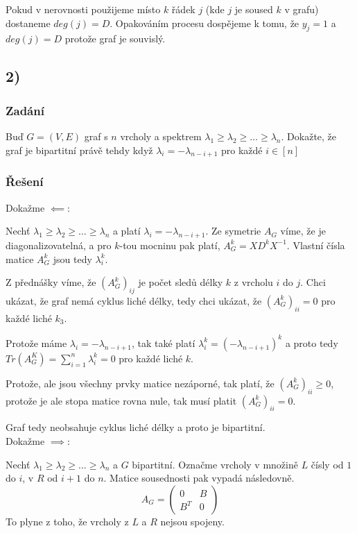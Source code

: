 \documentclass[../main.tex]{subfiles}
\begin{document}
Pokud v nerovnosti použijeme místo $k$ řádek $j$ (kde $j$ je soused $k$ v grafu) dostaneme $deg(j) = D$. Opakováním procesu dospějeme k tomu, že $y_j = 1$ a $deg(j) = D$ protože graf je souvislý.



\subsection{2)}
\subsubsection*{Zadání}
Buď $G=(V,E)$ graf s $n$ vrcholy a spektrem $\lambda_1 \geq \lambda_2 \geq \dots \geq \lambda_n$.
Dokažte, že graf je bipartitní právě tehdy když $\lambda_i = - \lambda_{n-i+1}$ pro každé $i\in [n]$

\subsubsection*{Řešení}


Dokažme $\impliedby$: 

Nechť $\lambda_1 \geq \lambda_2 \geq \dots \geq \lambda_n$ a platí $\lambda_i = - \lambda_{n-i+1}$. Ze symetrie $A_G$ víme, že je diagonalizovatelná, a pro $k$-tou mocninu pak platí, 
$A_G^k = X D^k X^{-1}$. Vlastní čísla matice $A_G^k$ jsou tedy $\lambda_i^k$.

Z přednášky víme, že $(A^k_G)_{ij}$ je počet sledů délky $k$ z vrcholu $i$ do $j$. Chci ukázat, že graf nemá cyklus liché délky, tedy chci ukázat, že $(A^k_G)_{ii} = 0$ pro každé liché $k_3$.

Protože máme $\lambda_i = - \lambda_{n-i+1}$, tak také platí $\lambda_i^k = (- \lambda_{n-i+1})^k$ a proto tedy $Tr(A_G^K) = \sum_{i=1}^n \lambda_i^k = 0$ pro každé liché $k$.

Protože, ale jsou všechny prvky matice nezáporné, tak platí, že $(A^k_G)_{ii} \geq 0$, protože je ale stopa matice rovna nule, tak musí platit $(A^k_G)_{ii} = 0$.

Graf tedy neobsahuje cyklus liché délky a proto je bipartitní.\\
Dokažme $\implies$: 

Nechť $\lambda_1 \geq \lambda_2 \geq \dots \geq \lambda_n$ a $G$ bipartitní. Označme vrcholy v množině $L$ čísly od $1$ do $i$, v $R$ od $i+1$ do $n$.
Matice sousednosti pak vypadá následovně.
\begin{equation*}
    A_G = \begin{pmatrix}
        0 & B \\
        B^T & 0 
        \end{pmatrix} 
\end{equation*} 
 To plyne z toho, že vrcholy z $L$ a $R$ nejsou spojeny. 
 
\end{document}
